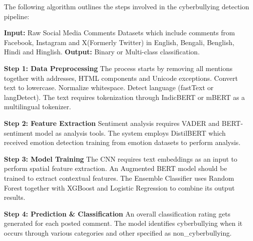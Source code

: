 The following algorithm outlines the steps involved in the cyberbullying detection pipeline:

\begin{algorithmic}
\State \textbf{Input:} Raw Social Media Comments Datasets which include comments from Facebook, Instagram and X(Formerly Twitter) in English, Bengali, Benglish, Hindi and Hinglish.
\State \textbf{Output:} Binary or Multi-class classification.

\State \textbf{Step 1: Data Preprocessing}
\State The process starts by removing all mentions together with addresses, HTML components and Unicode exceptions.
\State Convert text to lowercase.
\State Normalize whitespace.
\State Detect language (fastText or langDetect).
\State The text requires tokenization through IndicBERT or mBERT as a multilingual tokenizer.

\State \textbf{Step 2: Feature Extraction}
\State Sentiment analysis requires VADER and BERT-sentiment model as analysis tools.
\State The system employs DistilBERT which received emotion detection training from emotion datasets to perform analysis.

\State \textbf{Step 3: Model Training}
\State The CNN requires text embeddings as an input to perform spatial feature extraction.
\State An Augmented BERT model should be trained to extract contextual features.
\State The Ensemble Classifier uses Random Forest together with XGBoost and Logistic Regression to combine its output results.

\State \textbf{Step 4: Prediction \& Classification}
\State An overall classification rating gets generated for each posted comment.
\State The model identifies cyberbullying when it occurs through various categories and other specified as non\_cyberbullying.


\end{algorithmic}
\\
\textbf{ }
\\
